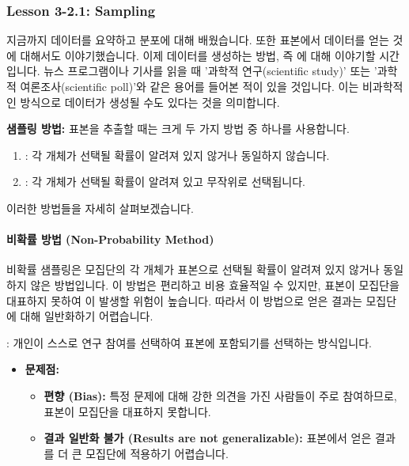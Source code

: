 \documentclass[11pt,a4paper]{article}
\theoremstyle{definition}
\begin{document}
\subsubsection{Lesson 3-2.1: Sampling}

지금까지 데이터를 요약하고 분포에 대해 배웠습니다. 또한 표본에서 데이터를 얻는 것에 대해서도 이야기했습니다. 이제 데이터를 생성하는 방법, 즉 에 대해 이야기할 시간입니다. 뉴스 프로그램이나 기사를 읽을 때 '과학적 연구(scientific study)' 또는 '과학적 여론조사(scientific poll)'와 같은 용어를 들어본 적이 있을 것입니다. 이는 비과학적인 방식으로 데이터가 생성될 수도 있다는 것을 의미합니다.

\begin{tcolorbox}[summarybox]
\textbf{샘플링 방법:}
표본을 추출할 때는 크게 두 가지 방법 중 하나를 사용합니다.
\begin{enumerate}
    \item {}: 각 개체가 선택될 확률이 알려져 있지 않거나 동일하지 않습니다.
    \item {}: 각 개체가 선택될 확률이 알려져 있고 무작위로 선택됩니다.
\end{enumerate}
이러한 방법들을 자세히 살펴보겠습니다.
\end{tcolorbox}

\paragraph{비확률 방법 (Non-Probability Method)}
비확률 샘플링은 모집단의 각 개체가 표본으로 선택될 확률이 알려져 있지 않거나 동일하지 않은 방법입니다. 이 방법은 편리하고 비용 효율적일 수 있지만, 표본이 모집단을 대표하지 못하여 이 발생할 위험이 높습니다. 따라서 이 방법으로 얻은 결과는 모집단에 대해 일반화하기 어렵습니다.

\begin{tcolorbox}[infobox, title={비확률 방법 (1/2): 자발적 샘플링 (Volunteer Sampling)}]
: 개인이 스스로 연구 참여를 선택하여 표본에 포함되기를 선택하는 방식입니다.
\begin{itemize}
    \item \textbf{문제점:}
    \begin{itemize}
        \item \textbf{편향 (Bias):} 특정 문제에 대해 강한 의견을 가진 사람들이 주로 참여하므로, 표본이 모집단을 대표하지 못합니다.
        \item \textbf{결과 일반화 불가 (Results are not generalizable):} 표본에서 얻은 결과를 더 큰 모집단에 적용하기 어렵습니다.
    \end{itemize}
\end{itemize}
\end{tcolorbox}
\end{document}
